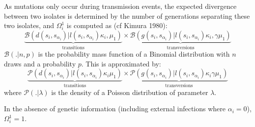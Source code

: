 \documentclass[10pt]{article}
\begin{document}
As mutations only occur during transmission events, the expected divergence between two isolates is determined by the number of generations separating these two isolates, and $\Omega_i^1$ is computed as (cf Kimura 1980): 
\begin{equation}
\underbrace{\mathcal{B}\left(d(s_i,s_{\alpha_i}) | l(s_i,s_{\alpha_i}) \kappa_i, \mu_1 \right)}_{\mbox{transitions}}
\times 
\underbrace{\mathcal{B}\left(g(s_i,s_{\alpha_i}) | l(s_i,s_{\alpha_i}) \kappa_i, \gamma \mu_1 \right)}_{\mbox{transversions}}
\end{equation}
% 
$\mathcal{B}(. | n, p)$ is the probability mass function of a Binomial distribution with $n$ draws and a probability $p$.
This is approximated by:
\begin{equation}
 \underbrace{\mathcal{P}\left(d(s_i,s_{\alpha_i}) | l(s_i,s_{\alpha_i}) \kappa_i \mu_1 \right)}_{\mbox{transitions}}
 \times 
 \underbrace{\mathcal{P}\left(g(s_i,s_{\alpha_i}) | l(s_i,s_{\alpha_i}) \kappa_i \gamma \mu_1 \right)}_{\mbox{transversions}}
 \end{equation}
where $\mathcal{P}(. | \lambda)$ is the density of a Poisson distribution of parameter $\lambda$.

In the absence of genetic information (including external infections where $\alpha_i=0$), $\Omega_i^1 = 1$.
~\\
\end{document}

